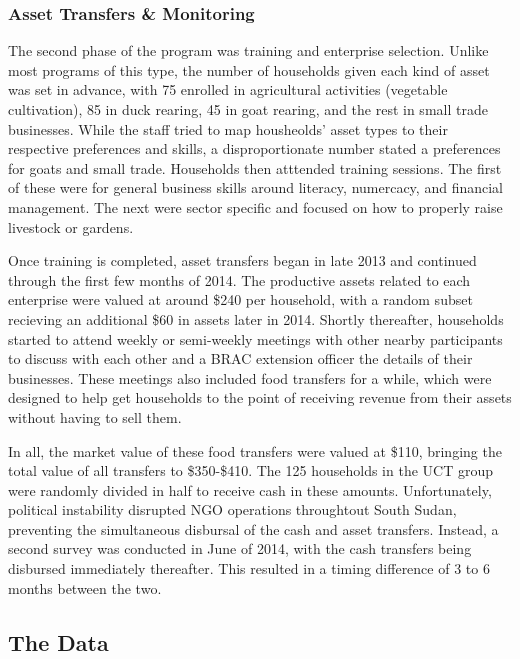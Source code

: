 \documentclass[12pt,article]{article}
\begin{document}
\subsubsection{Asset Transfers \& Monitoring}
\label{sec-2-0-2}

The second phase of the program was training and enterprise selection. Unlike most
programs of this type, the number of households given each kind of asset was set in
advance, with 75 enrolled in agricultural activities (vegetable cultivation), 85 in
duck rearing, 45 in goat rearing, and the rest in small trade businesses. While the
staff tried to map housheolds' asset types to their respective preferences and
skills, a disproportionate number stated a preferences for goats and small trade.
Households then atttended training sessions. The first of these were for general
business skills around literacy, numercacy, and financial management. The next were
sector specific and focused on how to properly raise livestock or gardens. 

Once training is completed, asset transfers began in late 2013 and continued through
the first few months of 2014. The productive assets related to each enterprise were
valued at around \$240 per household, with a random subset recieving an additional \$60
in assets later in 2014. Shortly thereafter, households started to attend weekly or
semi-weekly meetings with other nearby participants to discuss with each other and a
BRAC extension officer the details of their businesses. These meetings also included
food transfers for a while, which were designed to help get households to the point
of receiving revenue from their assets without having to sell them.

In all, the market value of these food transfers were valued at \$110, bringing the
total value of all transfers to \$350-\$410. The 125 households in the UCT group were
randomly divided in half to receive cash in these amounts. Unfortunately, political
instability disrupted NGO operations throughtout South Sudan, preventing the
simultaneous disbursal of the cash and asset transfers. Instead, a second survey was
conducted in June of 2014, with the cash transfers being disbursed immediately
thereafter. This resulted in a timing difference of 3 to 6 months between the two.

\subsection{The Data}
\label{sec-2-1}
\end{document}
